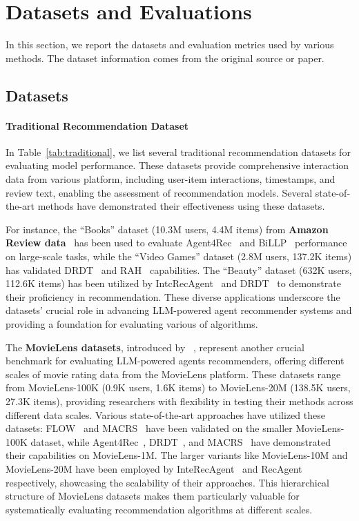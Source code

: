 \section{Datasets and Evaluations}

In this section, we report the datasets and evaluation metrics used by various methods. 
The dataset information comes from the original source or paper.

\subsection{Datasets}

\paragraph{Traditional Recommendation Dataset} 

In Table~\ref{tab:traditional}, we list several traditional recommendation datasets for evaluating model performance.
These datasets provide comprehensive interaction data from various platform, including user-item interactions, timestamps, and review text, enabling the assessment of recommendation models. 
Several state-of-the-art methods have demonstrated their effectiveness using these datasets. 

For instance, the ``Books'' dataset (10.3M users, 4.4M items) from \textbf{Amazon Review data}~\cite{mcauley2015image} has been used to evaluate Agent4Rec~\cite{zhang2024generative} and BiLLP~\cite{shi2024large} performance on large-scale tasks, while the ``Video Games'' dataset (2.8M users, 137.2K items) has validated DRDT~\cite{wang2023drdt} and RAH~\cite{shu2024rah} capabilities. 
The ``Beauty'' dataset (632K users, 112.6K items) has been utilized by IntcRecAgent~\cite{huang2023recommender} and DRDT~\cite{wang2023drdt} to demonstrate their proficiency in recommendation. 
These diverse applications underscore the datasets' crucial role in advancing LLM-powered agent recommender systems and providing a foundation for evaluating various of algorithms.


The \textbf{MovieLens datasets}, introduced by ~\cite{harper2015movielens}, represent another crucial benchmark for evaluating LLM-powered agents recommenders, offering different scales of movie rating data from the MovieLens platform. 
These datasets range from MovieLens-100K (0.9K users, 1.6K items) to MovieLens-20M (138.5K users, 27.3K items), providing researchers with flexibility in testing their methods across different data scales.
Various state-of-the-art approaches have utilized these datasets: FLOW~\cite{cai2024flow} and MACRS~\cite{fang2024multi} have been validated on the smaller MovieLens-100K dataset, while Agent4Rec~\cite{zhang2024generative}, DRDT~\cite{wang2023drdt}, and MACRS~\cite{fang2024multi} have demonstrated their capabilities on MovieLens-1M. 
The larger variants like MovieLens-10M and MovieLens-20M have been employed by InteRecAgent~\cite{huang2023recommender} and RecAgent~\cite{yoon2024evaluating} respectively, showcasing the scalability of their approaches. 
This hierarchical structure of MovieLens datasets makes them particularly valuable for systematically evaluating recommendation algorithms at different scales.

